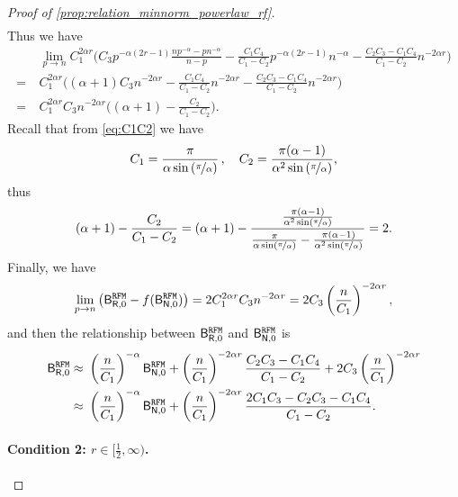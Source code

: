 \begin{proof}[Proof of \cref{prop:relation_minnorm_powerlaw_rf}]
\[\begin{aligned}
\end{aligned}
\]
Thus we have
\[
\begin{aligned}
&~\lim_{p \to n} C_1^{2\alpha r}\Big(C_3p^{-\alpha(2r-1)}\frac{np^{-\alpha} - pn^{-\alpha}}{n-p} - \frac{C_1C_4}{C_1-C_2}p^{-\alpha(2r-1)}n^{-\alpha} - \frac{C_2C_3-C_1C_4}{C_1-C_2}n^{-2\alpha r}\Big)\\
=&~ C_1^{2\alpha r}\Big((\alpha+1)C_3n^{-2\alpha r} - \frac{C_1C_4}{C_1-C_2}n^{-2\alpha r} - \frac{C_2C_3-C_1C_4}{C_1-C_2}n^{-2\alpha r}\Big)\\
=&~ C_1^{2\alpha r}C_3n^{-2\alpha r}\Big((\alpha+1) - \frac{C_2}{C_1-C_2}\Big).
\end{aligned}
\]
Recall that from \cref{eq:C1C2} we have
\[
\begin{aligned}
C_1 = \frac{\pi}{\alpha \sin\left(\nicefrac{\pi}{\alpha}\right)}\,, \quad C_2 = \frac{\pi(\alpha-1)}{\alpha^2 \sin\left(\nicefrac{\pi}{\alpha}\right)},
\end{aligned}
\]
thus 
\[
\begin{aligned}
(\alpha+1) - \frac{C_2}{C_1-C_2} = (\alpha+1) - \frac{ \frac{\pi(\alpha-1)}{\alpha^2 \sin\left(\nicefrac{\pi}{\alpha}\right)}}{\frac{\pi}{\alpha \sin\left(\nicefrac{\pi}{\alpha}\right)} - \frac{\pi(\alpha-1)}{\alpha^2 \sin\left(\nicefrac{\pi}{\alpha}\right)}} = 2.
\end{aligned}
\]
Finally, we have
\[
\begin{aligned}
\lim_{p \to n}\left( \mathsf B_{\mathsf R,0}^{\tt RFM} - f(\mathsf B_{\mathsf N,0}^{\tt RFM}) \right) = 2C_1^{2\alpha r}C_3n^{-2\alpha r} = 2C_3\left(\frac{n}{C_1}\right)^{-2\alpha r},
\end{aligned}
\]
and then the relationship between $\mathsf B_{\mathsf R,0}^{\tt RFM}$ and $\mathsf B_{\mathsf N,0}^{\tt RFM}$ is 
\begin{equation}\label{eq:B_under_power_law_1}
    \begin{split}
        \mathsf B_{\mathsf R,0}^{\tt RFM} \approx&~ \left(\frac{n}{C_1}\right)^{-\alpha} \mathsf B_{\mathsf N,0}^{\tt RFM} + \left(\frac{n}{C_1}\right)^{-2\alpha r}\frac{C_2C_3-C_1C_4}{C_1-C_2} + 2C_3\left(\frac{n}{C_1}\right)^{-2\alpha r}\\
        \approx&~ \left(\frac{n}{C_1}\right)^{-\alpha} \mathsf B_{\mathsf N,0}^{\tt RFM} + \left(\frac{n}{C_1}\right)^{-2\alpha r}\frac{2C_1C_3-C_2C_3-C_1C_4}{C_1-C_2}.
    \end{split}
\end{equation}


\paragraph{Condition 2: $r \in [\frac{1}{2}, \infty)$.}


\end{proof}
